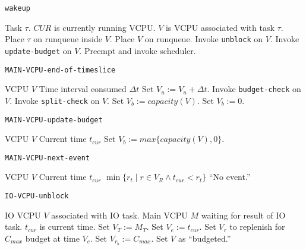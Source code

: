 \documentclass{article}
\begin{document}
\begin{algorithm}
  \caption {\tt wakeup}\label{alg:wakeup}
  \begin{algorithmic}[1]
    \REQUIRE Task $\tau$.
    \REQUIRE $CUR$ is currently running VCPU.
    \REQUIRE $V$ is VCPU associated with task $\tau$.
    \STATE Place $\tau$ on runqueue inside $V$.
    \STATE Place $V$ on runqueue.
    \STATE Invoke {\tt unblock} on $V$.
    \STATE Invoke {\tt update-budget} on $V$.
    \STATE Preempt and invoke scheduler.
    \ENDIF
  \end{algorithmic}
\end{algorithm}

\begin{algorithm}
  \caption{\tt MAIN-VCPU-end-of-timeslice}\label{alg:vcpu_eot}
  \begin{algorithmic}[1]
    \REQUIRE VCPU $V$
    \REQUIRE Time interval consumed $\Delta t$
    \STATE Set $V_u:=V_u+\Delta t$.
    \STATE Invoke {\tt budget-check} on $V$.
    \STATE Invoke {\tt split-check} on $V$.
    \ENDIF
    \STATE Set $V_b:=capacity(V)$.
    \ELSE
    \STATE Set $V_b:=0$.
    \ENDIF
  \end{algorithmic}
\end{algorithm}

\begin{algorithm}
  \caption{\tt MAIN-VCPU-update-budget}\label{alg:vcpu_upbudg}
  \begin{algorithmic}[1]
    \REQUIRE VCPU $V$
    \REQUIRE Current time $t_{cur}$
    \STATE Set $V_b:=max\{capacity(V), 0\}$.
  \end{algorithmic}
\end{algorithm}

\begin{algorithm}
  \caption{\tt MAIN-VCPU-next-event}\label{alg:vcpu_nextevent}
  \begin{algorithmic}[1]
    \REQUIRE VCPU $V$
    \REQUIRE Current time $t_{cur}$
    \RETURN $\min\{r_t \mid r\in V_R\wedge t_{cur}<r_t\}$ \OR ``No event.''
  \end{algorithmic}
\end{algorithm}

\begin{algorithm}
  \caption{\tt IO-VCPU-unblock}\label{alg:iovcpu_unblock}
  \begin{algorithmic}[1]
    \REQUIRE IO VCPU $V$ associated with IO task.
    \REQUIRE Main VCPU $M$ waiting for result of IO task.
    \REQUIRE $t_{cur}$ is current time.
    \STATE Set $V_T:=M_T$.
    \ENDIF
    \STATE Set $V_e:=t_{cur}$.
    \ENDIF
    \STATE Set $V_r$ to replenish for $C_{max}$ budget at time $V_e$.
    \ENDIF
    \ELSE
    \STATE Set $V_{r_b}:=C_{max}$.
    \ENDIF
    \STATE Set $V$ as ``budgeted.''
  \end{algorithmic}
\end{algorithm}
\end{document}
